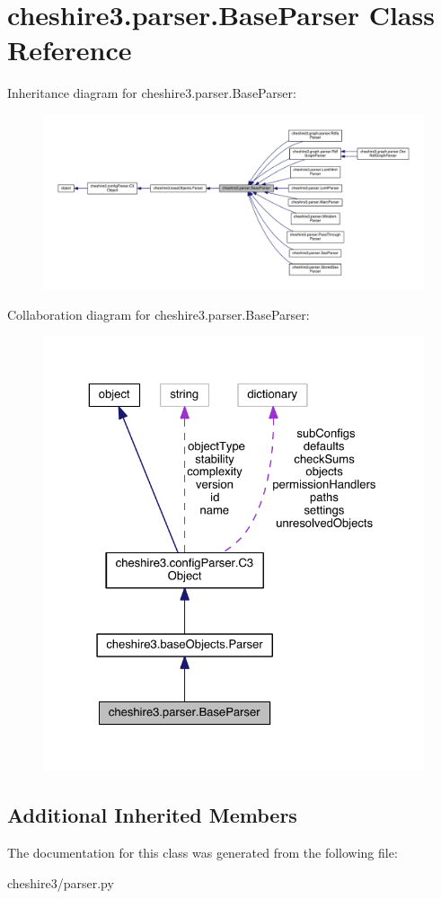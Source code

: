 \hypertarget{classcheshire3_1_1parser_1_1_base_parser}{\section{cheshire3.\-parser.\-Base\-Parser Class Reference}
\label{classcheshire3_1_1parser_1_1_base_parser}
}


Inheritance diagram for cheshire3.\-parser.\-Base\-Parser\-:
\nopagebreak
\begin{figure}[H]
\begin{center}
\leavevmode
\includegraphics[width=350pt]{classcheshire3_1_1parser_1_1_base_parser__inherit__graph}
\end{center}
\end{figure}


Collaboration diagram for cheshire3.\-parser.\-Base\-Parser\-:
\nopagebreak
\begin{figure}[H]
\begin{center}
\leavevmode
\includegraphics[width=325pt]{classcheshire3_1_1parser_1_1_base_parser__coll__graph}
\end{center}
\end{figure}
\subsection*{Additional Inherited Members}


The documentation for this class was generated from the following file\-:\begin{DoxyCompactItemize}
\item 
cheshire3/parser.\-py\end{DoxyCompactItemize}
